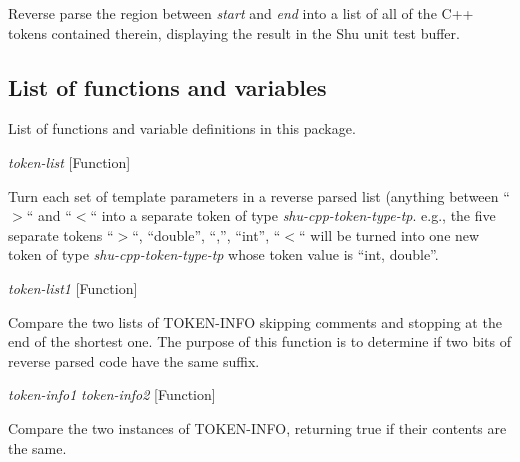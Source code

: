 \begin{doc-string}
Reverse parse the region between \emph{start} and \emph{end} into a list of all of the C++
tokens contained therein, displaying the result in the Shu unit test buffer.
\end{doc-string}

\subsection{List of functions and variables}

List of functions and variable definitions in this package.



\vspace{1em}
\noindent
{}
\usebox{\funcname}\emph{token-list}
 \hfill [Function]

\begin{doc-string}
Turn each set of template parameters in a reverse parsed list (anything between
``$>$`` and ``$<$`` into a separate token of type \emph{shu-cpp-token-type-tp}.  e.g., the
five separate tokens ``$>$``, ``double'', ``,'', ``int'', ``$<$`` will be turned into
one new token of type \emph{shu-cpp-token-type-tp} whose token value is ``int, double''.
\end{doc-string}

\vspace{1em}
\noindent
{}
\usebox{\funcname}\emph{token-list1}
 \hfill [Function]
\hspace*{\wd\funcname}

\begin{doc-string}
Compare the two lists of TOKEN-INFO skipping comments and stopping at the end
of the shortest one.  The purpose of this function is to determine if two bits
of reverse parsed code have the same suffix.
\end{doc-string}

\vspace{1em}
\noindent
{}
\usebox{\funcname}\emph{token-info1} \emph{token-info2}
 \hfill [Function]

\begin{doc-string}
Compare the two instances of TOKEN-INFO, returning true if their contents
are the same.
\end{doc-string}

